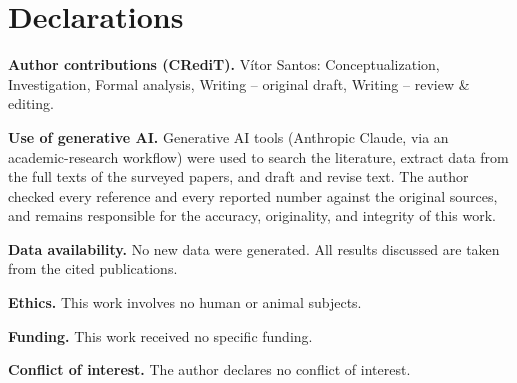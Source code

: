 \section*{Declarations}
\noindent\textbf{Author contributions (CRediT).} Vítor Santos: Conceptualization, Investigation, Formal analysis, Writing -- original draft, Writing -- review \& editing.

\noindent\textbf{Use of generative AI.} Generative AI tools (Anthropic Claude, via an academic-research workflow) were used to search the literature, extract data from the full texts of the surveyed papers, and draft and revise text. The author checked every reference and every reported number against the original sources, and remains responsible for the accuracy, originality, and integrity of this work.

\noindent\textbf{Data availability.} No new data were generated. All results discussed are taken from the cited publications.

\noindent\textbf{Ethics.} This work involves no human or animal subjects.

\noindent\textbf{Funding.} This work received no specific funding.

\noindent\textbf{Conflict of interest.} The author declares no conflict of interest.
